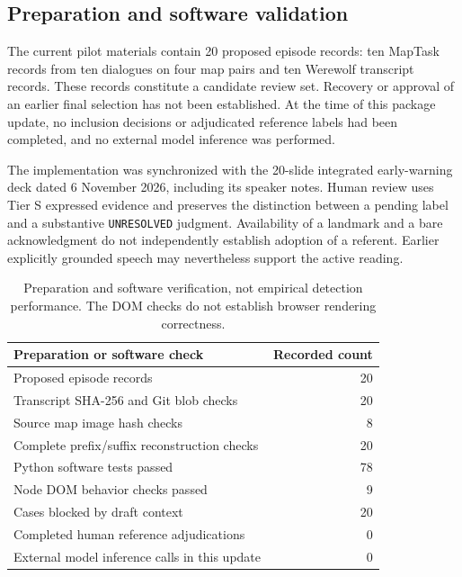 \subsection{Preparation and software validation}
The current pilot materials contain 20 proposed episode records: ten MapTask
records from ten dialogues on four map pairs and ten Werewolf transcript
records. These records constitute a candidate review set. Recovery or approval
of an earlier final selection has not been established. At the time of this
package update, no inclusion decisions or adjudicated reference labels had
been completed, and no external model inference was performed.

The implementation was synchronized with the 20-slide integrated early-warning
deck dated 6 November 2026, including its speaker notes. Human review uses
Tier S expressed evidence and preserves the distinction between a pending
label and a substantive \texttt{UNRESOLVED} judgment. Availability of a landmark
and a bare acknowledgment do not independently establish adoption of a referent.
Earlier explicitly grounded speech may nevertheless support the active reading.

\begin{table}[htbp]
\centering
\begin{tabular}{lr}
\hline
Preparation or software check & Recorded count \\
\hline
Proposed episode records & 20 \\
Transcript SHA-256 and Git blob checks & 20 \\
Source map image hash checks & 8 \\
Complete prefix/suffix reconstruction checks & 20 \\
Python software tests passed & 78 \\
Node DOM behavior checks passed & 9 \\
Cases blocked by draft context & 20 \\
Completed human reference adjudications & 0 \\
External model inference calls in this update & 0 \\
\hline
\end{tabular}
\caption{Preparation and software verification, not empirical detection performance.
The DOM checks do not establish browser rendering correctness.}
\label{tab:cim-software-preparation}
\end{table}


